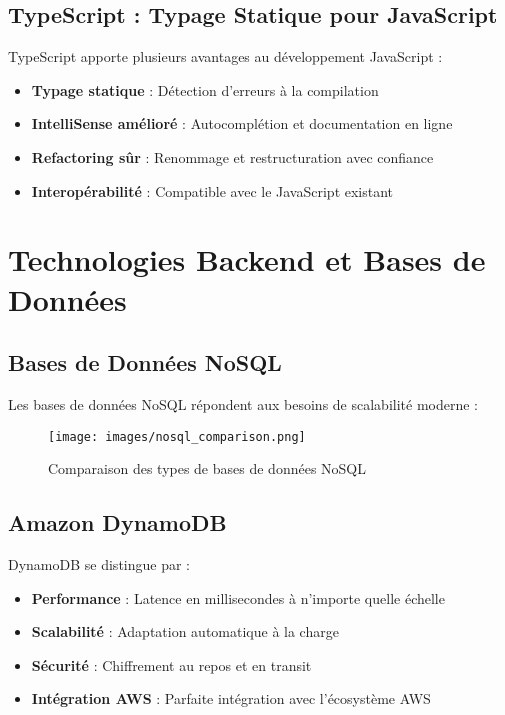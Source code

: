 \subsection{TypeScript : Typage Statique pour JavaScript}

TypeScript apporte plusieurs avantages au développement JavaScript :
\begin{itemize}
    \item \textbf{Typage statique} : Détection d'erreurs à la compilation
    \item \textbf{IntelliSense amélioré} : Autocomplétion et documentation en ligne
    \item \textbf{Refactoring sûr} : Renommage et restructuration avec confiance
    \item \textbf{Interopérabilité} : Compatible avec le JavaScript existant
\end{itemize}

\section{Technologies Backend et Bases de Données}

\subsection{Bases de Données NoSQL}

Les bases de données NoSQL répondent aux besoins de scalabilité moderne :

\begin{figure}[H]
    \centering
    \texttt{[image: images/nosql\_comparison.png]}
    \caption{Comparaison des types de bases de données NoSQL}
    \label{fig:nosql_comparison}
\end{figure}

\subsection{Amazon DynamoDB}

DynamoDB se distingue par :
\begin{itemize}
    \item \textbf{Performance} : Latence en millisecondes à n'importe quelle échelle
    \item \textbf{Scalabilité} : Adaptation automatique à la charge
    \item \textbf{Sécurité} : Chiffrement au repos et en transit
    \item \textbf{Intégration AWS} : Parfaite intégration avec l'écosystème AWS
\end{itemize}

